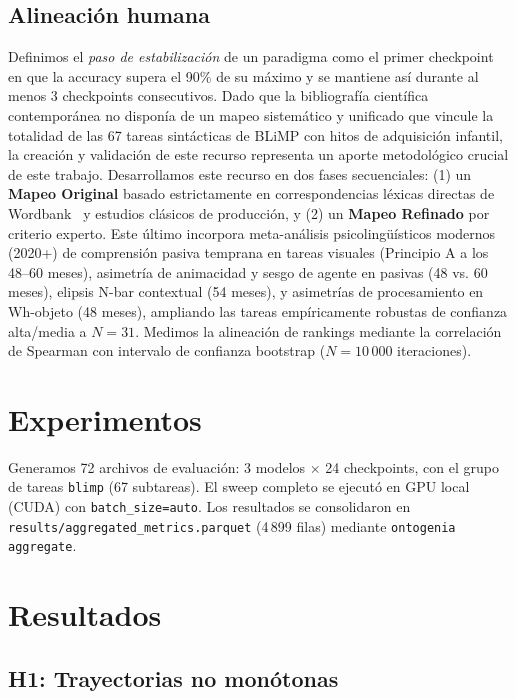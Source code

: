 \documentclass[11pt]{article}
\begin{document}
\subsection{Alineación humana}
Definimos el \textit{paso de estabilización} de un paradigma como el primer checkpoint en que la accuracy supera el 90\% de su máximo y se mantiene así durante al menos 3 checkpoints consecutivos. Dado que la bibliografía científica contemporánea no disponía de un mapeo sistemático y unificado que vincule la totalidad de las 67 tareas sintácticas de BLiMP con hitos de adquisición infantil, la creación y validación de este recurso representa un aporte metodológico crucial de este trabajo. Desarrollamos este recurso en dos fases secuenciales: (1) un \textbf{Mapeo Original} basado estrictamente en correspondencias léxicas directas de Wordbank~\cite{frank2017wordbank} y estudios clásicos de producción, y (2) un \textbf{Mapeo Refinado} por criterio experto. Este último incorpora meta-análisis psicolingüísticos modernos (2020+) de comprensión pasiva temprana en tareas visuales (Principio A a los 48--60 meses), asimetría de animacidad y sesgo de agente en pasivas (48 vs. 60 meses), elipsis N-bar contextual (54 meses), y asimetrías de procesamiento en Wh-objeto (48 meses), ampliando las tareas empíricamente robustas de confianza alta/media a $N=31$. Medimos la alineación de rankings mediante la correlación de Spearman con intervalo de confianza bootstrap ($N = 10\,000$ iteraciones).

\section{Experimentos}
\label{sec:experimentos}

Generamos 72 archivos de evaluación: 3 modelos $\times$ 24 checkpoints, con el grupo de tareas \texttt{blimp} (67 subtareas). El sweep completo se ejecutó en GPU local (CUDA) con \texttt{batch\_size=auto}. Los resultados se consolidaron en \texttt{results/aggregated\_metrics.parquet} (4\,899 filas) mediante \texttt{ontogenia aggregate}.

\section{Resultados}
\label{sec:resultados}

\subsection{H1: Trayectorias no monótonas}
\end{document}
